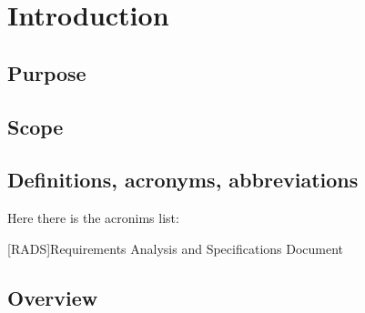 \section{Introduction} \label{sec:intro}

\subsection{Purpose} \label{subsec:purpose}


\subsection{Scope} \label{subsec:scope}


\subsection{Definitions, acronyms, abbreviations} \label{subsec:def}

Here there is the acronims list:

\begin{acronym}[RADS] %

[RADS]{Requirements Analysis and Specifications Document}

\end{acronym}


\subsection{Overview} \label{subsec:overview}



